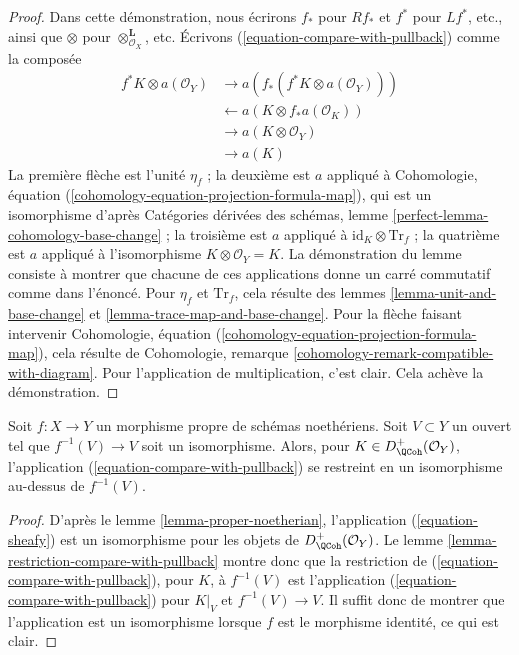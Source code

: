 \begin{proof}
Dans cette démonstration, nous écrirons $f_*$ pour $Rf_*$ et $f^*$ pour $Lf^*$, etc., ainsi que $\otimes$ pour $\otimes^\mathbf{L}_{\mathcal{O}_X}$, etc. Écrivons (\ref{equation-compare-with-pullback}) comme la composée
\begin{align*}
f^*K \otimes a(\mathcal{O}_Y)
& \to
a(f_*(f^*K \otimes a(\mathcal{O}_Y))) \\
& \leftarrow
a(K \otimes f_*a(\mathcal{O}_K)) \\
& \to
a(K \otimes \mathcal{O}_Y) \\
& \to
a(K)
\end{align*}
La première flèche est l'unité $\eta_f$ ; la deuxième est $a$ appliqué à Cohomologie, équation (\ref{cohomology-equation-projection-formula-map}), qui est un isomorphisme d'après Catégories dérivées des schémas, lemme \ref{perfect-lemma-cohomology-base-change} ; la troisième est $a$ appliqué à $\text{id}_K \otimes \text{Tr}_f$ ; la quatrième est $a$ appliqué à l'isomorphisme $K \otimes \mathcal{O}_Y = K$. La démonstration du lemme consiste à montrer que chacune de ces applications donne un carré commutatif comme dans l'énoncé. Pour $\eta_f$ et $\text{Tr}_f$, cela résulte des lemmes \ref{lemma-unit-and-base-change} et \ref{lemma-trace-map-and-base-change}. Pour la flèche faisant intervenir Cohomologie, équation (\ref{cohomology-equation-projection-formula-map}), cela résulte de Cohomologie, remarque \ref{cohomology-remark-compatible-with-diagram}. Pour l'application de multiplication, c'est clair. Cela achève la démonstration.
\end{proof}

\begin{lemma}
\label{lemma-compare-on-open}
Soit $f : X \to Y$ un morphisme propre de schémas noethériens. Soit $V \subset Y$ un ouvert tel que $f^{-1}(V) \to V$ soit un isomorphisme. Alors, pour $K \in D_\QCoh^+(\mathcal{O}_Y)$, l'application (\ref{equation-compare-with-pullback}) se restreint en un isomorphisme au-dessus de $f^{-1}(V)$.
\end{lemma}

\begin{proof}
D'après le lemme \ref{lemma-proper-noetherian}, l'application (\ref{equation-sheafy}) est un isomorphisme pour les objets de $D_\QCoh^+(\mathcal{O}_Y)$. Le lemme \ref{lemma-restriction-compare-with-pullback} montre donc que la restriction de (\ref{equation-compare-with-pullback}), pour $K$, à $f^{-1}(V)$ est l'application (\ref{equation-compare-with-pullback}) pour $K|_V$ et $f^{-1}(V) \to V$. Il suffit donc de montrer que l'application est un isomorphisme lorsque $f$ est le morphisme identité, ce qui est clair.
\end{proof}

